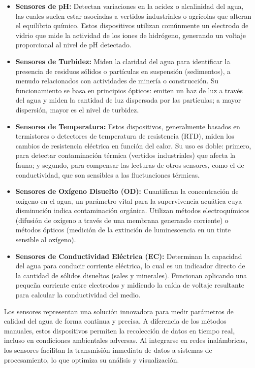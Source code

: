 \begin{itemize}
    \item \textbf{Sensores de pH:} 
    Detectan variaciones en la acidez o alcalinidad del agua, las cuales suelen estar asociadas a vertidos industriales o agrícolas que alteran el equilibrio químico. Estos dispositivos utilizan comúnmente un electrodo de vidrio que mide la actividad de los iones de hidrógeno, generando un voltaje proporcional al nivel de pH detectado.
    
    \item \textbf{Sensores de Turbidez:} 
    Miden la claridad del agua para identificar la presencia de residuos sólidos o partículas en suspensión (sedimentos), a menudo relacionados con actividades de minería o construcción. Su funcionamiento se basa en principios ópticos: emiten un haz de luz a través del agua y miden la cantidad de luz dispersada por las partículas; a mayor dispersión, mayor es el nivel de turbidez.
    
    \item \textbf{Sensores de Temperatura:} 
    Estos dispositivos, generalmente basados en termistores o detectores de temperatura de resistencia (RTD), miden los cambios de resistencia eléctrica en función del calor. Su uso es doble: primero, para detectar contaminación térmica (vertidos industriales) que afecta la fauna; y segundo, para compensar las lecturas de otros sensores, como el de conductividad, que son sensibles a las fluctuaciones térmicas.
    
    \item \textbf{Sensores de Oxígeno Disuelto (OD):} 
    Cuantifican la concentración de oxígeno en el agua, un parámetro vital para la supervivencia acuática cuya disminución indica contaminación orgánica. Utilizan métodos electroquímicos (difusión de oxígeno a través de una membrana generando corriente) o métodos ópticos (medición de la extinción de luminescencia en un tinte sensible al oxígeno).

    \item \textbf{Sensores de Conductividad Eléctrica (EC):} 
    Determinan la capacidad del agua para conducir corriente eléctrica, lo cual es un indicador directo de la cantidad de sólidos disueltos (sales y minerales). Funcionan aplicando una pequeña corriente entre electrodos y midiendo la caída de voltaje resultante para calcular la conductividad del medio.
\end{itemize}

Los sensores representan una solución innovadora para medir parámetros de calidad del agua de forma continua y precisa. A diferencia de los métodos manuales, estos dispositivos permiten la recolección de datos en tiempo real, incluso en condiciones ambientales adversas. Al integrarse en redes inalámbricas, los sensores facilitan la transmisión inmediata de datos a sistemas de procesamiento, lo que optimiza su análisis y visualización.

